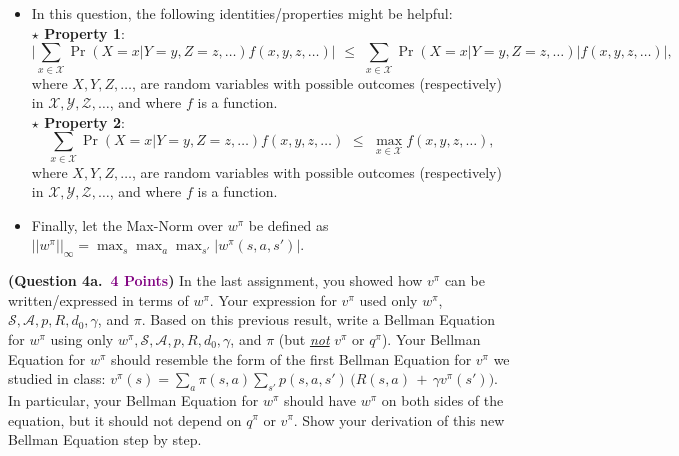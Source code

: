 \documentclass{article}
\newcommand{\POINTS}[1]{\textcolor{purple}{\textbf{{#1}}}}
\begin{document}
\begin{enumerate}
    \begin{itemize} 
        \item In this question, the following identities/properties might be helpful:
        \vspace{0.2cm}\\
        \textbf{$\star$ Property 1}:
        \begin{equation}
        \label{eq:property1}
            \Big|\sum_{x \in \mathcal X} \Pr(X=x | Y=y, Z=z, \ldots) f(x, y, z, \ldots)\Big|\,\, \leq\,\, \sum_{x \in \mathcal X}\Pr(X=x | Y=y, Z=z, \ldots) \Big|f(x,y,z,\ldots)\Big|,
        \end{equation}
        where $X, Y, Z, \ldots$, are random variables with possible outcomes (respectively) in $\mathcal X, \mathcal Y, \mathcal Z, \ldots$,  and where $f$ is a function.
        \vspace{0.2cm}\\
        \textbf{$\star$ Property 2}:
        \begin{equation}
        \label{eq:property2}
            \sum_{x \in \mathcal X} \Pr(X=x | Y=y, Z=z, \ldots) f(x, y, z, \ldots)\,\, \leq\,\, \max_{x \in \mathcal X} f(x,y,z,\ldots),
        \end{equation}
        where $X, Y, Z, \ldots$, are random variables with possible outcomes (respectively) in $\mathcal X, \mathcal Y, \mathcal Z, \ldots$,  and where $f$ is a function.        
        \item Finally, let the Max-Norm over $w^\pi$ be defined as $||w^\pi||_\infty = \max_s \max_a \max_{s'} |w^\pi(s,a,s')|$.
    \end{itemize}
    
    \vspace{0.5cm}
    \textbf{(Question 4a.~\POINTS{4 Points})} In the last assignment, you showed how $v^\pi$ can be written/expressed in terms of $w^\pi$. Your expression for $v^\pi$ used only $w^\pi$, $\mathcal{S}, \mathcal{A}, p, R, d_0, \gamma$, and $\pi$. Based on this previous result, write a Bellman Equation for $w^\pi$ using only $w^\pi, \mathcal{S}, \mathcal{A}, p, R, d_0, \gamma$, and $\pi$ (but \ul{\textit{not}} $v^\pi$ or $q^\pi$). Your Bellman Equation for $w^\pi$ should resemble the form of the first Bellman Equation for $v^\pi$ we studied in class: $v^\pi(s) = \sum_a \pi(s,a) \sum_{s'} p(s,a,s') \, \big( R(s,a) \, + \, \gamma v^\pi(s') \big)$. In particular, your Bellman Equation for $w^\pi$  should have $w^\pi$ on both sides of the equation, but it should not depend on $q^\pi$ or $v^\pi$. Show your derivation of this new Bellman Equation step by step. 
    

\end{enumerate}
\end{document}
